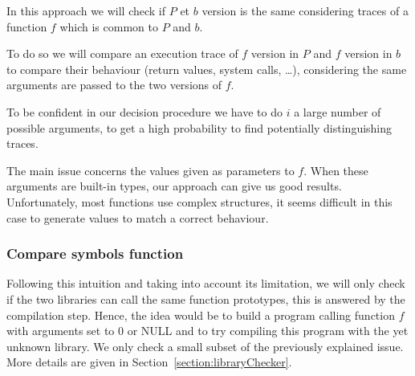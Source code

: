\documentclass{article}
\newcommand{\symb}{{symbols}}
\newcommand{\comp}{{compilation}}
\begin{document}

    In this approach we will check if $P$ et $b$ version is the same
    considering traces of a function $f$ which is common to $P$ and $b$.

    To do so we will compare an execution trace of $f$
    version in $P$ and $f$ version in $b$ to compare their behaviour (return
    values, system calls, \dots),
    considering the same arguments are passed to the two versions of $f$. 

    To be confident in our decision procedure we have to do $i$ a large number
    of possible arguments, to get a high probability to find potentially distinguishing
    traces.

    The main issue concerns the values given as parameters to $f$. When these arguments
    are built-in types, our approach can give us good results. Unfortunately,
    most functions use complex structures, it seems difficult in this case to
    generate values to match a correct behaviour.
	
	\subsubsection{Compare symbols function}
	
    Following this intuition and taking into account its limitation, we will
    only check if the two libraries can call the same function prototypes,
    this is answered by the compilation step.
    Hence, the idea would be to build a program calling function $f$ with
    arguments set to $0$ or NULL and to try compiling this program with the
    yet unknown library. We only check a small subset of the previously explained
    issue. More details are given in Section~\ref{section:libraryChecker}.
\end{document}
